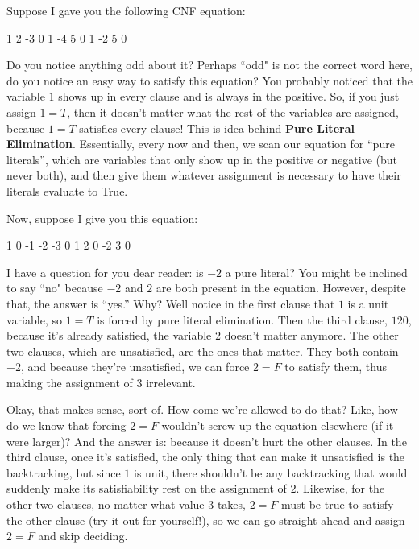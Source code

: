 \documentclass[../main.tex]{subfiles}
\begin{document}
Suppose I gave you the following CNF equation:

\begin{FVerbatim}
1 2 -3 0
1 -4 5 0
1 -2 5 0
\end{FVerbatim}

Do you notice anything odd about it? Perhaps ``odd" is not the correct word here, do you notice 
an easy way to satisfy this equation? You probably noticed that the variable $1$ shows up in every 
clause and is always in the positive. So, if you just assign $1 = T$, then it doesn't matter what 
the rest of the variables are assigned, because $1 = T$ satisfies every clause! This is idea behind 
\textbf{Pure Literal Elimination}. Essentially, every now and then, we scan our equation for ``pure 
literals'', which are variables that only show up in the positive or negative (but never both), and
then give them whatever assignment is necessary to have their literals evaluate to True. 

Now, suppose I give you this equation:
\begin{FVerbatim}
1 0
-1 -2 -3 0
1 2 0
-2 3 0
\end{FVerbatim}

I have a question for you dear reader: is $-2$ a pure literal? You might be inclined to say ``no"
because $-2$ and $2$ are both present in the equation. However, despite that, the answer is ``yes.''
Why? Well notice in the first clause that $1$ is a unit variable, so $1 = T$ is forced by pure literal 
elimination. Then the third clause, $1 2 0$, because it's already satisfied, the variable $2$
doesn't matter anymore. The other two clauses, which are unsatisfied, are the ones that matter. 
They both contain $-2$, and because they're unsatisfied, we can force $2 = F$ to satisfy them,
thus making the assignment of $3$ irrelevant. 

Okay, that makes sense, sort of. How come we're allowed to do that? Like, how do we know that 
forcing $2 = F$ wouldn't screw up the equation elsewhere (if it were larger)? And the answer is:
because it doesn't hurt the other clauses. In the third clause, once it's satisfied, the only thing 
that can make it unsatisfied is the backtracking, but since $1$ is unit, there shouldn't be any 
backtracking that would suddenly make its satisfiability rest on the assignment of $2$. Likewise, 
for the other two clauses, no matter what value $3$ takes, $2 = F$ must be true to satisfy the 
other clause (try it out for yourself!), so we can go straight ahead and assign $2 = F$ and skip 
deciding. 
\end{document}
